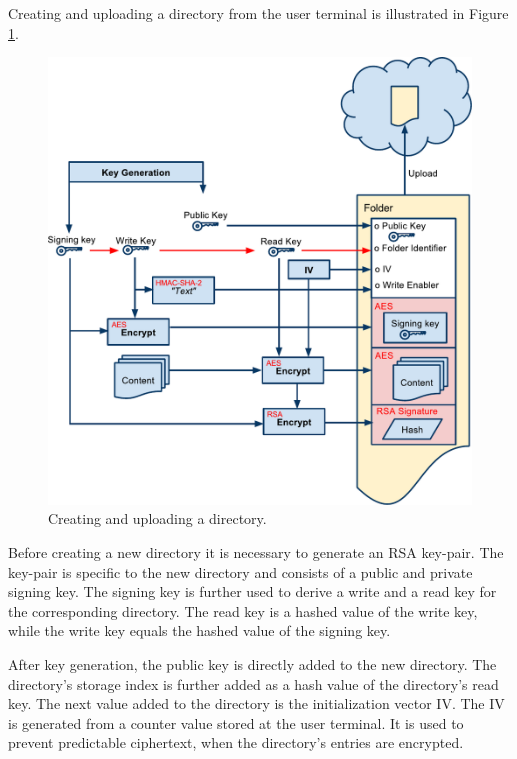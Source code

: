 \documentclass[pdftex,english,10pt,b5paper,twoside]{book}
\begin{document}
Creating and uploading a directory from the user terminal is illustrated in
Figure \ref{fig:CS:CD}.

\begin{figure}[h!]
    \centering
        \includegraphics[width=\columnwidth]{CryptoCreateFolder.pdf}
	    \caption{Creating and uploading a directory.}
    \label{fig:CS:CD}
\end{figure}

Before creating a new directory it is necessary to generate an RSA key-pair. The
key-pair is specific to the new directory and consists of a public and private
signing key. The signing key is further used to derive a write and a read key
for the corresponding directory. The read key is a hashed value of the write
key, while the write key equals the hashed value of the signing  key. 

After key generation, the public key is directly added to the new directory. The
directory's storage index is further added as a hash value of the directory's
read key. The next value added to the directory is the initialization vector
\ac{IV}. The IV is generated from a counter value stored at the user terminal. It
is used to prevent predictable ciphertext, when the directory's entries are encrypted.
\end{document}

